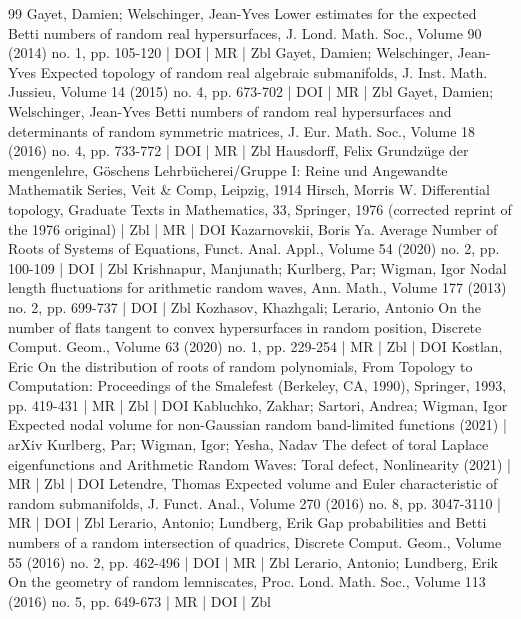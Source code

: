 \begin{thebibliography}{99}
Gayet, Damien; Welschinger, Jean-Yves Lower estimates for the expected Betti numbers of random real hypersurfaces, J. Lond. Math. Soc., Volume 90 (2014) no. 1, pp. 105-120 | DOI | MR | Zbl
Gayet, Damien; Welschinger, Jean-Yves Expected topology of random real algebraic submanifolds, J. Inst. Math. Jussieu, Volume 14 (2015) no. 4, pp. 673-702 | DOI | MR | Zbl
Gayet, Damien; Welschinger, Jean-Yves Betti numbers of random real hypersurfaces and determinants of random symmetric matrices, J. Eur. Math. Soc., Volume 18 (2016) no. 4, pp. 733-772 | DOI | MR | Zbl
Hausdorff, Felix Grundzüge der mengenlehre, Göschens Lehrbücherei/Gruppe I: Reine und Angewandte Mathematik Series, Veit \& Comp, Leipzig, 1914
Hirsch, Morris W. Differential topology, Graduate Texts in Mathematics, 33, Springer, 1976 (corrected reprint of the 1976 original) | Zbl | MR | DOI
Kazarnovskii, Boris Ya. Average Number of Roots of Systems of Equations, Funct. Anal. Appl., Volume 54 (2020) no. 2, pp. 100-109 | DOI | Zbl
Krishnapur, Manjunath; Kurlberg, Par; Wigman, Igor Nodal length fluctuations for arithmetic random waves, Ann. Math., Volume 177 (2013) no. 2, pp. 699-737 | DOI | Zbl
Kozhasov, Khazhgali; Lerario, Antonio On the number of flats tangent to convex hypersurfaces in random position, Discrete Comput. Geom., Volume 63 (2020) no. 1, pp. 229-254 | MR | Zbl | DOI
Kostlan, Eric On the distribution of roots of random polynomials, From Topology to Computation: Proceedings of the Smalefest (Berkeley, CA, 1990), Springer, 1993, pp. 419-431 | MR | Zbl | DOI
Kabluchko, Zakhar; Sartori, Andrea; Wigman, Igor Expected nodal volume for non-Gaussian random band-limited functions (2021) | arXiv
Kurlberg, Par; Wigman, Igor; Yesha, Nadav The defect of toral Laplace eigenfunctions and Arithmetic Random Waves: Toral defect, Nonlinearity (2021) | MR | Zbl | DOI
Letendre, Thomas Expected volume and Euler characteristic of random submanifolds, J. Funct. Anal., Volume 270 (2016) no. 8, pp. 3047-3110 | MR | DOI | Zbl
Lerario, Antonio; Lundberg, Erik Gap probabilities and Betti numbers of a random intersection of quadrics, Discrete Comput. Geom., Volume 55 (2016) no. 2, pp. 462-496 | DOI | MR | Zbl
Lerario, Antonio; Lundberg, Erik On the geometry of random lemniscates, Proc. Lond. Math. Soc., Volume 113 (2016) no. 5, pp. 649-673 | MR | DOI | Zbl

\end{thebibliography}
